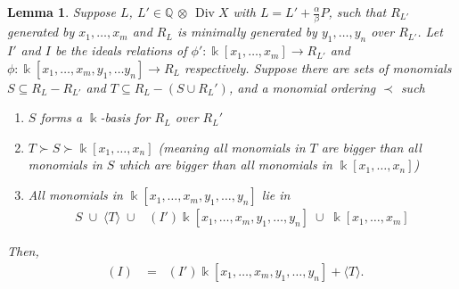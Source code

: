 \documentclass{amsart}
\theoremstyle{plain}
\newtheorem{lem}[thm]{Lemma}
\theoremstyle{definition}
\theoremstyle{remark}
\numberwithin{equation}{section}
\newcommand\BQ{{\mathbb Q}}
\newcommand\Bk{{\Bbbk}}
\DeclareMathOperator\di{Div}
\newcommand{\halfcan}{L}
\DeclareMathOperator{\initial}{in_\prec}
\begin{document}
\begin{lem}
\label{lem:relations_from_generators_induction} 
Suppose $\halfcan$, $\halfcan' \in \BQ$ $\otimes$ $\di X$ with $\halfcan=\halfcan'+\frac{\alpha}{\beta}P$, such that $R_{\halfcan'}$ generated by $x_1, \ldots, x_m$
and $R_{\halfcan}$ is minimally generated by $y_1, \ldots, y_n$ over 
$R_{\halfcan'}$.  Let $I'$ and $I$ be the ideals relations of $\phi':\Bk[x_1, \ldots, x_m]\to R_{\halfcan'}$ and $\phi:\Bk[x_1, \ldots, x_m, y_1, \ldots y_n]\to R_{\halfcan}$ respectively.
Suppose there are sets of monomials $S\subseteq R_\halfcan-R_{\halfcan'}$ and $T\subseteq R_\halfcan-(S\cup R_\halfcan')$, and a monomial ordering $\prec$ such 
\begin{enumerate}
\item $S$ forms a $\Bk$-basis for $R_\halfcan$ over $R_\halfcan'$
\item $T \succ S\succ \Bk[x_1, \ldots, x_n]$ {\rm(}meaning all monomials in $T$ are bigger than all monomials in $S$ which are bigger than all monomials in $\Bk[x_1, \ldots, x_n]${\rm)}
\item All monomials in $\Bk[x_1, \ldots, x_m, y_1, \ldots, y_n]$ lie in 
\begin{align*}
	S \; \cup\; \langle T\rangle \; \cup \; \initial(I') \Bk[x_1, \ldots, x_m, y_1, \ldots, y_n] \; \cup \; \Bk[x_1, \ldots, x_m]
\end{align*}
\end{enumerate}
Then,
\begin{align*}
	\initial(I) & = \initial(I') \Bk[x_1, \ldots, x_m, y_1, \ldots, y_n]
	+ \langle T \rangle.
\end{align*}
\end{lem}
\end{document}

